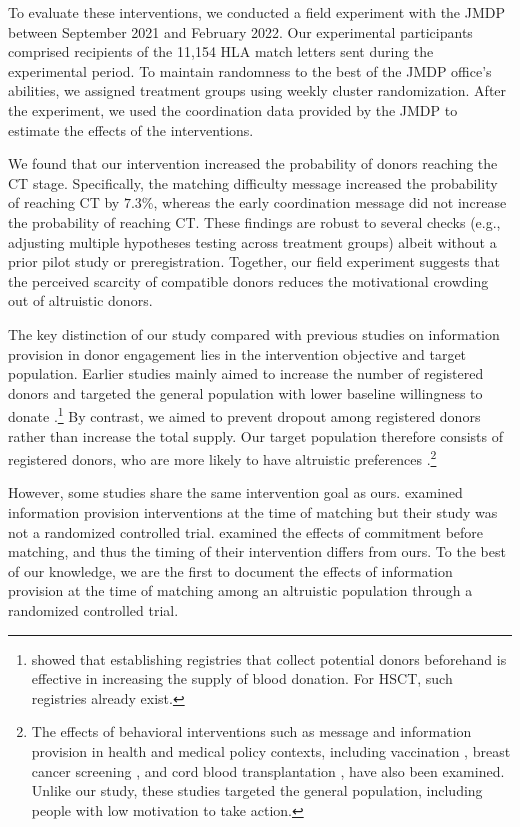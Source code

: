 \documentclass[12pt, a4paper]{article}
\begin{document}
To evaluate these interventions, we conducted a field experiment with the JMDP between September 2021 and February 2022. Our experimental participants comprised recipients of the 11,154 HLA match letters sent during the experimental period. To maintain randomness to the best of the JMDP office's abilities, we assigned treatment groups using weekly cluster randomization. After the experiment, we used the coordination data provided by the JMDP to estimate the effects of the interventions.

We found that our intervention increased the probability of donors reaching the CT stage. Specifically, the matching difficulty message increased the probability of reaching CT by \(7.3\)\%, whereas the early coordination message did not increase the probability of reaching CT. These findings are robust to several checks (e.g., adjusting multiple hypotheses testing across treatment groups) albeit without a prior pilot study or preregistration. Together, our field experiment suggests that the perceived scarcity of compatible donors reduces the motivational crowding out of altruistic donors.

The key distinction of our study compared with previous studies on information provision in donor engagement lies in the intervention objective and target population. Earlier studies mainly aimed to increase the number of registered donors and targeted the general population with lower baseline willingness to donate \citep{Li2016, Sallis2018, Robitaille2021, Goette2020, Goette2024}.\footnote{\citet{Heger2020} showed that establishing registries that collect potential donors beforehand is effective in increasing the supply of blood donation. For HSCT, such registries already exist.} By contrast, we aimed to prevent dropout among registered donors rather than increase the total supply. Our target population therefore consists of registered donors, who are more likely to have altruistic preferences \citep{Bergstrom2009, Ohtake2020}.\footnote{The effects of behavioral interventions such as message and information provision in health and medical policy contexts, including vaccination \citep[for example,][]{Dai2021, Milkman2021}, breast cancer screening \citep{Bertoni2020}, and cord blood transplantation \citep{Grieco2018}, have also been examined. Unlike our study, these studies targeted the general population, including people with low motivation to take action.}

However, some studies share the same intervention goal as ours. \citet{Switzer2018} examined information provision interventions at the time of matching but their study was not a randomized controlled trial. \citet{Haylock2024} examined the effects of commitment before matching, and thus the timing of their intervention differs from ours. To the best of our knowledge, we are the first to document the effects of information provision at the time of matching among an altruistic population through a randomized controlled trial.
\end{document}
